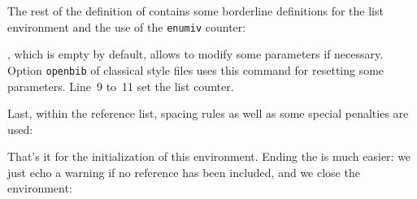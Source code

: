 The rest of the definition of  contains some 
borderline definitions for the list environment and the use of the
\verb+enumiv+ counter:
\begin{listingcont}
            \leftmargin{}
            \advance\leftmargin{}
            \@openbib@code
            \let\p@enumiv\@empty
            \renewcommand\theenumiv{\@arabic\c@enumiv}}%
\end{listingcont}
, which is empty by default, allows 
to modify some parameters if necessary. Option \texttt{openbib} of
classical style files uses this command for resetting some parameters.
Line~9 to~11 set the list counter.

Last, within the reference list, spacing rules as well as some special
penalties are used: 
\begin{listingcont}
      \sloppy
      \@clubpenalty \clubpenalty
      \sfcode`\.\@m}
\end{listingcont}


That's it for the initialization of this environment. Ending the
 is much easier:
we just echo a warning if no reference has been included, and we close
the  environment:



\label{bibitem}

